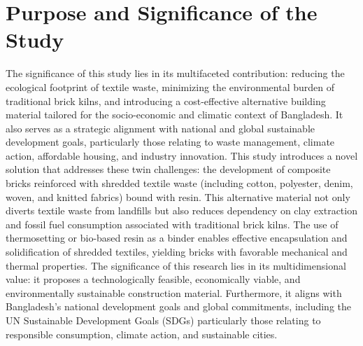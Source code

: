 \section{Purpose and Significance of the Study}
The significance of this study lies in its multifaceted contribution: reducing the ecological footprint of textile waste, minimizing the environmental burden of traditional brick kilns, and introducing a cost-effective alternative building material tailored for the socio-economic and climatic context of Bangladesh. It also serves as a strategic alignment with national and global sustainable development goals, particularly those relating to waste management, climate action, affordable housing, and industry innovation. This study introduces a novel solution that addresses these twin challenges: the development of composite bricks reinforced with shredded textile waste (including cotton, polyester, denim, woven, and knitted fabrics) bound with resin. This alternative material not only diverts textile waste from landfills but also reduces dependency on clay extraction and fossil fuel consumption associated with traditional brick kilns. The use of thermosetting or bio-based resin as a binder enables effective encapsulation and solidification of shredded textiles, yielding bricks with favorable mechanical and thermal properties. The significance of this research lies in its multidimensional value: it proposes a technologically feasible, economically viable, and environmentally sustainable construction material. Furthermore, it aligns with Bangladesh's national development goals and global commitments, including the UN Sustainable Development Goals (SDGs) particularly those relating to responsible consumption, climate action, and sustainable cities. 